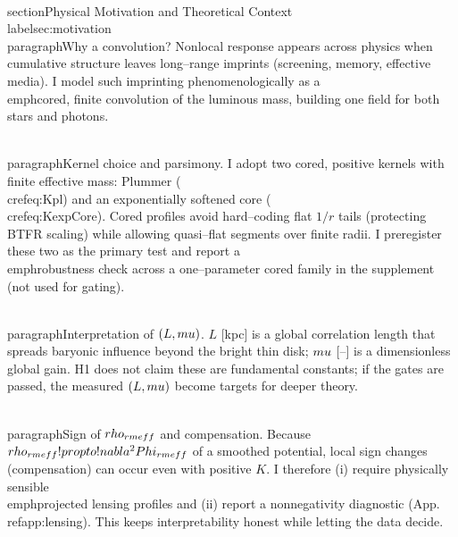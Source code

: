\documentclass[11pt,a4paper]{article}
\begin{document}
\\section{Physical Motivation and Theoretical Context}\\label{sec:motivation}
\\paragraph{Why a convolution?}
Nonlocal response appears across physics when cumulative structure leaves long–range imprints (screening, memory, effective media). I model such imprinting phenomenologically as a \\emph{cored, finite} convolution of the luminous mass, building one field for both stars and photons.

\\paragraph{Kernel choice and parsimony.}
I adopt two cored, positive kernels with finite effective mass: Plummer (\\cref{eq:Kpl}) and an exponentially softened core (\\cref{eq:KexpCore}). Cored profiles avoid hard–coding flat $1/r$ tails (protecting BTFR scaling) while allowing quasi–flat segments over finite radii. I preregister these two as the primary test and report a \\emph{robustness check} across a one–parameter cored family in the supplement (not used for gating).

\\paragraph{Interpretation of $(L,\\mu)$.}
$L$ [kpc] is a global correlation length that spreads baryonic influence beyond the bright thin disk; $\\mu$ [--] is a dimensionless global gain. H1 does not claim these are fundamental constants; if the gates are passed, the measured $(L,\\mu)$ become targets for deeper theory.

\\paragraph{Sign of $\\rho_{\\rm eff}$ and compensation.}
Because $\\rho_{\\rm eff}\\!\\propto\\!\\nabla^2\\Phi_{\\rm eff}$ of a smoothed potential, local sign changes (compensation) can occur even with positive $K$. I therefore (i) require physically sensible \\emph{projected} lensing profiles and (ii) report a nonnegativity diagnostic (App.~\\ref{app:lensing}). This keeps interpretability honest while letting the data decide.
\end{document}
